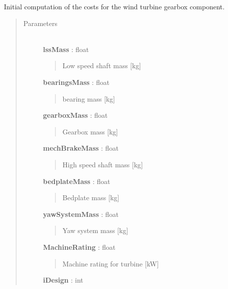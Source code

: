 \documentclass[letterpaper,10pt,openany,oneside]{sphinxmanual}
\begin{document}
\begin{fulllineitems}
\label{documentation:turbine_costSE.src.nacelle_costsSE.NacelleSystemCost}
Initial computation of the costs for the wind turbine gearbox component.
\begin{quote}\begin{description}
\item[{Parameters }] \leavevmode\\
\textbf{lssMass} : float
\begin{quote}

Low speed shaft mass {[}kg{]}
\end{quote}

\textbf{bearingsMass} : float
\begin{quote}

bearing mass {[}kg{]}
\end{quote}

\textbf{gearboxMass} : float
\begin{quote}

Gearbox mass {[}kg{]}
\end{quote}

\textbf{mechBrakeMass} : float
\begin{quote}

High speed shaft mass {[}kg{]}
\end{quote}

\textbf{bedplateMass} : float
\begin{quote}

Bedplate mass {[}kg{]}
\end{quote}

\textbf{yawSystemMass} : float
\begin{quote}

Yaw system mass {[}kg{]}
\end{quote}

\textbf{MachineRating} : float
\begin{quote}

Machine rating for turbine {[}kW{]}
\end{quote}

\textbf{iDesign} : int
\begin{quote}


\end{quote}
\end{description}
\end{quote}
\end{fulllineitems}
\end{document}
